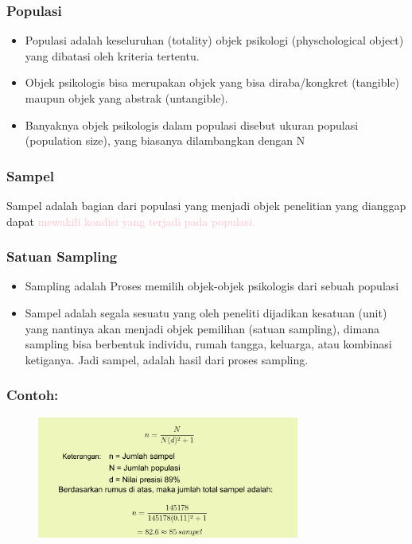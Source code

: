 \documentclass[main.tex]{subfiles}
\begin{document}
\begin{frame}[c]
	\frametitle{Populasi}
	\begin{itemize}
		\item Populasi adalah keseluruhan (totality) objek psikologi (physchological object) yang dibatasi oleh kriteria tertentu.
		\item Objek psikologis bisa merupakan objek yang bisa diraba/kongkret (tangible) maupun objek yang abstrak (untangible).
		\item Banyaknya objek psikologis dalam populasi disebut ukuran populasi (population size), yang biasanya dilambangkan dengan N
	\end{itemize}

\end{frame}

\begin{frame}[c]
	\frametitle{Sampel}
	Sampel adalah bagian dari populasi yang menjadi objek penelitian yang dianggap dapat \textcolor{pink}{mewakili  kondisi yang terjadi pada populasi.}

\end{frame}
\begin{frame}[c]
	\frametitle{Satuan Sampling}
	\begin{itemize}
		\item Sampling adalah Proses memilih objek-objek psikologis dari sebuah populasi
		\item Sampel adalah segala sesuatu yang oleh peneliti dijadikan kesatuan (unit) yang nantinya akan menjadi objek pemilihan (satuan sampling), dimana sampling bisa berbentuk individu, rumah tangga, keluarga, atau kombinasi ketiganya. Jadi sampel, adalah hasil dari proses sampling.
	\end{itemize}
\end{frame}

\begin{frame}[c]
	\frametitle{Contoh:}
	\begin{figure}
		\begin{center}
			\includegraphics[height=4cm]{figures/sampelrumus}
		\end{center}
	\end{figure}

\end{frame}
\end{document}
